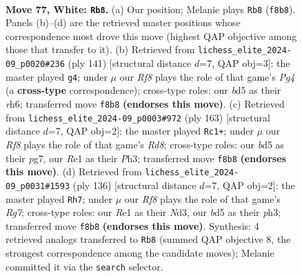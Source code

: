 \documentclass[11pt]{article}
\begin{document}
\clearpage

\begin{figure}[p]\centering
\begin{subfigure}{0.46\textwidth}\centering
\resizebox{\linewidth}{!}{%
\newchessgame
\chessboard[
  setfen={5R2/3k4/8/3b4/1P6/3K4/7r/4R3 w - - 27 77},
  showmover=false,
  pgfstyle=straightmove, color=movearrow, markmove={f8-b8}
]}
\caption{}
\end{subfigure}\hfill
\begin{subfigure}{0.46\textwidth}\centering
\resizebox{\linewidth}{!}{%
\newchessgame
\chessboard[
  setfen={8/R7/7R/4K1p1/1r6/8/8/6k1 b - - 0 71},
  showmover=false,
  pgfstyle=straightmove, color=movearrow, markmove={g5-g4}
]}
\caption{}
\end{subfigure}
\\[4pt]
\begin{subfigure}{0.46\textwidth}\centering
\resizebox{\linewidth}{!}{%
\newchessgame
\chessboard[
  setfen={8/4k1P1/8/8/5R2/2K4p/8/3r4 b - - 2 82},
  showmover=false,
  pgfstyle=straightmove, color=movearrow, markmove={d1-c1}
]}
\caption{}
\end{subfigure}\hfill
\begin{subfigure}{0.46\textwidth}\centering
\resizebox{\linewidth}{!}{%
\newchessgame
\chessboard[
  setfen={8/6R1/4r3/8/8/2PN1k1p/K7/8 w - - 8 69},
  showmover=false,
  pgfstyle=straightmove, color=movearrow, markmove={g7-h7}
]}
\caption{}
\end{subfigure}
\caption{\textbf{Move 77, White: \texttt{Rb8}.} (a) Our position; Melanie plays \texttt{Rb8} (\texttt{f8b8}). Panels (b)--(d) are the retrieved master positions whose correspondence most drove this move (highest QAP objective among those that transfer to it). (b) Retrieved from \texttt{lichess\_elite\_2024-09\_p0020\#236} (ply 141) [structural distance $d$=7, QAP obj=3]: the master played \texttt{g4}; under $\mu$ our \emph{Rf8} plays the role of that game's \emph{Pg4} (a \textbf{cross-type} correspondence); cross-type roles: our \emph{b}d5 as their \emph{r}h6; transferred move \texttt{f8b8} \textbf{(endorses this move)}. (c) Retrieved from \texttt{lichess\_elite\_2024-09\_p0003\#972} (ply 163) [structural distance $d$=7, QAP obj=2]: the master played \texttt{Rc1+}; under $\mu$ our \emph{Rf8} plays the role of that game's \emph{Rd8}; cross-type roles: our \emph{b}d5 as their \emph{p}g7, our \emph{R}e1 as their \emph{P}h3; transferred move \texttt{f8b8} \textbf{(endorses this move)}. (d) Retrieved from \texttt{lichess\_elite\_2024-09\_p0031\#1593} (ply 136) [structural distance $d$=7, QAP obj=2]: the master played \texttt{Rh7}; under $\mu$ our \emph{Rf8} plays the role of that game's \emph{Rg7}; cross-type roles: our \emph{R}e1 as their \emph{N}d3, our \emph{b}d5 as their \emph{p}h3; transferred move \texttt{f8b8} \textbf{(endorses this move)}. Synthesis: 4 retrieved analogs transferred to \texttt{Rb8} (summed QAP objective 8, the strongest correspondence among the candidate moves); Melanie committed it via the \texttt{search} selector.}
\label{fig:thought-m152}
\end{figure}
\end{document}
